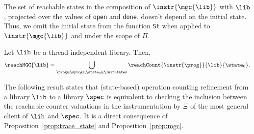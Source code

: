 %


The set of reachable states in the composition of $\instr{\mgc{\lib}}$ with $\lib$, projected over the values of {\tt open} and {\tt done}, doesn't depend on the initial state. Thus, we omit the initial state from the function {\tt St} when applied to $\instr{\mgc{\lib}}$ and under the scope of $\Pi$.

\begin{proposition}\label{prop:mgc}
Let $\lib$ be a thread-independent library. Then, 
\[
\reachMGC{\lib} = \bigcup_{\prog\in\sprogs,\state_0\in\InitStates}\reachCount{\instr{\prog}}{\lib}{\state_0}.
\]%
\end{proposition}

The following result states that (state-based) operation counting refinement from a library $\lib$ to a library $\spec$ 
is equivalent to checking the inclusion between the reachable counter valuations in the instrumentation by $\Xi$ of the most general client 
of $\lib$ and \resp $\spec$. 
It is a direct consequence of 
Proposition~\ref{prop:trace_state} and Proposition~\ref{prop:mgc}.

